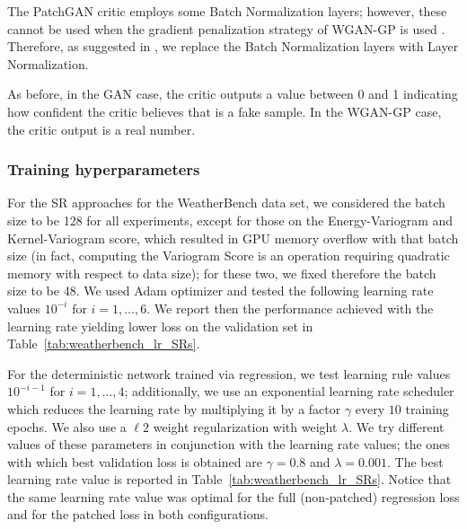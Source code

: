 \documentclass[twoside,11pt]{article}
\begin{document}
	The PatchGAN critic employs some Batch Normalization layers; however, these cannot be used when the gradient penalization strategy of WGAN-GP is used \citep{gulrajani2017improved}. Therefore, as suggested in \cite{gulrajani2017improved}, we replace the Batch Normalization layers with Layer Normalization.
	
	As before, in the GAN case, the critic outputs a value between 0 and 1 indicating how confident the critic believes that is a fake sample. In the WGAN-GP case, the critic output is a real number.
	
	
	
	\subsubsection{Training hyperparameters}\label{app:weatherbench_hyperparmeters}
	
	For the SR approaches for the WeatherBench data set, we considered the batch size to be 128 for all experiments, except for those on the Energy-Variogram and Kernel-Variogram score, which resulted in GPU memory overflow with that batch size (in fact, computing the Variogram Score is an operation requiring quadratic memory with respect to data size); for these two, we fixed therefore the batch size to be 48. We used Adam optimizer and tested the following learning rate values $ 10^{-i} $ for $ i=1,\ldots, 6 $. We report then the performance achieved with the learning rate yielding lower loss on the validation set in Table~\ref{tab:weatherbench_lr_SRs}.
	
	For the deterministic network trained via regression, we test learning rule values $ 10^{-i-1} $ for $ i=1,\ldots, 4 $; additionally, we use an exponential learning rate scheduler which reduces the learning rate by multiplying it by a factor $ \gamma $ every $ 10 $ training epochs. We also use a $ \ell2 $ weight regularization with weight $ \lambda  $. We try different values of these parameters in conjunction with the learning rate values; the ones with which best validation loss is obtained are $ \gamma=0.8 $ and $ \lambda=0.001 $. The best learning rate value is reported in Table~\ref{tab:weatherbench_lr_SRs}. Notice that the same learning rate value was optimal for the full (non-patched) regression loss and for the patched loss in both configurations.
	
\end{document}
